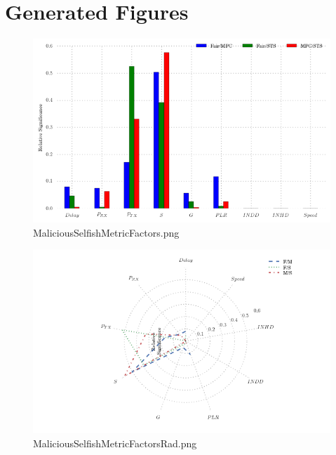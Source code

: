 \documentclass{article}
\begin{document}
\section{Generated Figures}


\begin{figure}[h!]
\centering
\includegraphics[width=\linewidth]{MaliciousSelfishMetricFactors.png}
\caption{MaliciousSelfishMetricFactors.png}
\end{figure}




\begin{figure}[h!]
\centering
\includegraphics[width=\linewidth]{MaliciousSelfishMetricFactorsRad.png}
\caption{MaliciousSelfishMetricFactorsRad.png}
\end{figure}
\end{document}
